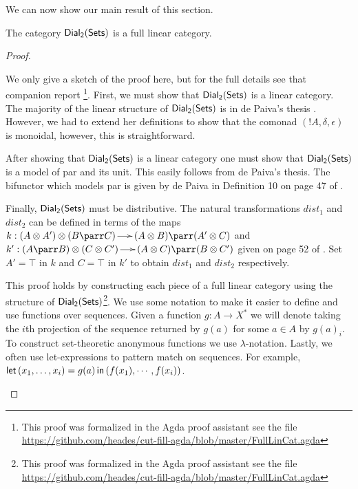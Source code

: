 We can now show our main result of this section.
\begin{lemma}
  \label{lemma:ddial_is_a_linear_category}
  The category $\mathsf{Dial_2}(\mathsf{Sets})$ is a full linear category.
\end{lemma}
\begin{proof}
  \begin{paper}
    We only give a sketch of the proof here, but for the full details
    see that companion report \cite{Eades:2015}\footnote{This proof
      was formalized in the Agda proof assistant see the file
      \url{https://github.com/heades/cut-fill-agda/blob/master/FullLinCat.agda}}. First,
    we must show that $\mathsf{Dial_2}(\mathsf{Sets})$ is a linear category.  The majority of
    the linear structure of $\mathsf{Dial_2}(\mathsf{Sets})$ is in de Paiva's thesis
    \cite{dePaiva:1988}.  However, we had to extend her definitions to
    show that the comonad $(!A,\delta,\epsilon)$ is monoidal, however,
    this is straightforward.

    After showing that $\mathsf{Dial_2}(\mathsf{Sets})$ is a linear category one must show that
    $\mathsf{Dial_2}(\mathsf{Sets})$ is a model of par and its unit.  This easily follows from
    de Paiva's thesis.  The bifunctor which models par is given by de
    Paiva in Definition 10 on page 47 of \cite{dePaiva:1988}.

    Finally, $\mathsf{Dial_2}(\mathsf{Sets})$ must be distributive.  The natural
    transformations $dist_1$ and $dist_2$ can be defined in terms of
    the maps $k : (A \otimes A') \otimes (B \parr C) \to (A \otimes B)
    \parr (A' \otimes C)$ and $k' : (A \parr B) \otimes (C \otimes C')
    \to (A \otimes C) \parr (B \otimes C')$ given on page 52 of
    \cite{dePaiva:1988}.  Set $A' = \top$ in $k$ and $C = \top$ in
    $k'$ to obtain $dist_1$ and $dist_2$ respectively.
  \end{paper}
\begin{report}
  This proof holds by constructing each piece of a full linear
  category using the structure of $\mathsf{Dial_2}(\mathsf{Sets})$\footnote{This proof was
    formalized in the Agda proof assistant see the file
    \url{https://github.com/heades/cut-fill-agda/blob/master/FullLinCat.agda}}.
  We use some notation to make it easier to define and use functions
  over sequences.  Given a function $g : A \to X^*$ we will denote
  taking the $i$th projection of the sequence returned by $g(a)$ for
  some $a \in A$ by $g(a)_i$.  To construct set-theoretic anonymous
  functions we use $\lambda$-notation.  Lastly, we often use
  let-expressions to pattern match on sequences.  For example, $\mathsf{let}\,
  (x_1,\ldots,x_i) = g(a) \,\mathsf{in}\, (f(x_1),\cdots,f(x_i))$.
    

\end{report}
\end{proof}

